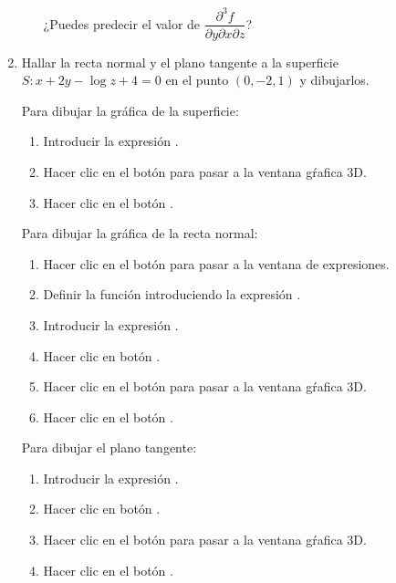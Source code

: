 \begin{enumerate}[leftmargin=*]
\begin{enumerate}
¿Puedes predecir el valor de $\dfrac{{\partial ^3 f}} {{\partial y\partial x\partial z}}$?
\end{enumerate}

\item Hallar la recta normal y el plano tangente a la superficie $S: x+2y-\log z +4 =0$ en el punto $(0,-2,1)$ y dibujarlos.
\begin{indicacion}
Para dibujar la gráfica de la superficie:
\begin{enumerate}
\item Introducir la expresión .
\item Hacer clic en el botón  para pasar a la ventana gŕafica 3D.
\item Hacer clic en el botón .
\end{enumerate}
Para dibujar la gráfica de la recta normal:
\begin{enumerate}[resume]
\item Hacer clic en el botón  para pasar a la ventana de expresiones.
\item Definir la función introduciendo la expresión .
\item Introducir la expresión .
\item Hacer clic en botón .
\item Hacer clic en el botón  para pasar a la ventana gŕafica 3D.
\item Hacer clic en el botón .
\end{enumerate}
Para dibujar el plano tangente:
\begin{enumerate}[resume]
\item Introducir la expresión .
\item Hacer clic en botón .
\item Hacer clic en el botón  para pasar a la ventana gŕafica 3D.
\item Hacer clic en el botón .
\end{enumerate}
\end{indicacion}


\end{enumerate}
